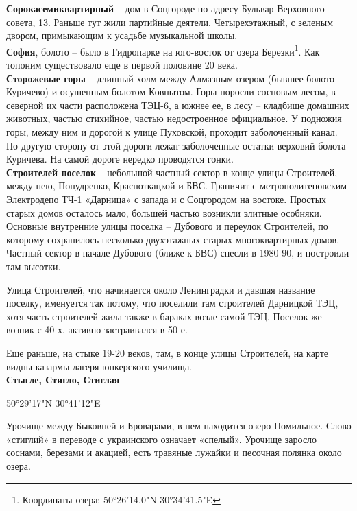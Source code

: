 

\textbf{Сорокасемиквартирный} – дом в Соцгороде по адресу Бульвар Верховного совета, 13. Раньше тут жили партийные деятели. Четырехэтажный, с зеленым двором, примыкающим к усадьбе музыкальной школы.\\

\textbf{София}, болото – было в Гидропарке на юго-восток от озера Березки\footnote{Координаты озера: 50°26'14.0"N 30°34'41.5"E}. Как топоним существовало еще в первой половине 20 века.\\
 
\textbf{Сторожевые горы} – длинный холм между Алмазным озером (бывшее болото Куричево) и осушенным болотом Ковпытом. Горы поросли сосновым лесом, в северной их части расположена ТЭЦ-6, а южнее ее, в лесу – кладбище домашних животных, частью стихийное, частью недостроенное официальное. У подножия горы, между ним и дорогой к улице Пуховской, проходит заболоченный канал. По другую сторону от этой дороги лежат заболоченные остатки верховий болота Куричева. На самой дороге нередко проводятся гонки.\\

\textbf{Строителей поселок} – небольшой частный сектор в конце улицы Строителей, между нею, Попудренко, Красноткацкой и БВС. Граничит с метрополитеновским Электродепо ТЧ-1 «Дарница» с запада и с Соцгородом на востоке. Простых старых домов осталось мало, большей частью возникли элитные особняки. Основные внутренние улицы поселка – Дубового и переулок Строителей, по которому сохранилось несколько двухэтажных старых многоквартирных домов. Частный сектор в начале Дубового (ближе к БВС) снесли в 1980-90, и построили там высотки.

Улица Строителей, что начинается около Ленинградки и давшая название поселку, именуется так потому, что поселили там строителей Дарницкой ТЭЦ, хотя часть строителей жила также в бараках возле самой ТЭЦ. Поселок же возник с 40-х, активно застраивался в 50-е.

Еще раньше, на стыке 19-20 веков, там, в конце улицы Строителей, на карте видны казармы лагеря юнкерского училища.\\


\textbf{Стыгле, Стигло, Стиглая}

50°29'17"N 30°41'12"E

Урочище между Быковней и Броварами, в нем находится озеро Помильное. Слово «стиглий» в переводе с украинского означает «спелый». Урочище заросло соснами, березами и акацией, есть травяные лужайки и песочная полянка около озера.


